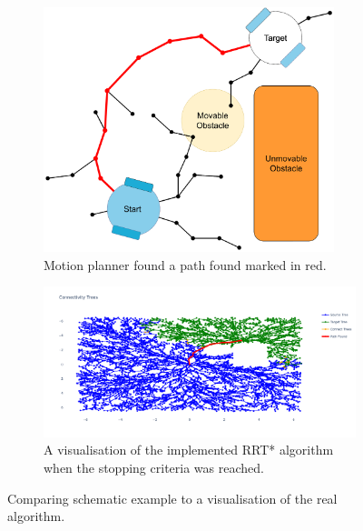 \begin{figure}[H]
    \centering
    \begin{subfigure}{0.5\textwidth}
    \centering
    \includegraphics[width=0.93\textwidth]{figures/mp/7mp_path_found.drawio.png}
    \caption{Motion planner found a path found marked in red.}
    \end{subfigure}%

    \begin{subfigure}{\textwidth}
    \hspace{-0.7cm}
    \includegraphics[width=1.1\textwidth]{figures/mp/mp_the_real_deal.png}
    \caption{A visualisation of the implemented \acs{RRT*} algorithm\\when the stopping criteria was reached.}
    \end{subfigure}
    \label{fig:motion_planner_comparison}%
    \caption{Comparing schematic example to a visualisation of the real algorithm.}
\end{figure}

